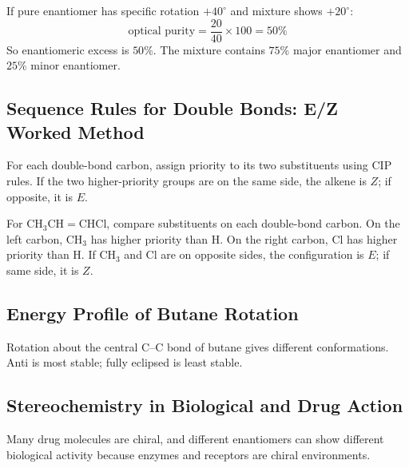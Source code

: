 \documentclass[12pt,a4paper]{article}
\begin{document}
\begin{tcolorbox}[examplebox, title={Solved Example: Enantiomeric Excess}]
If pure enantiomer has specific rotation $+40^\circ$ and mixture shows $+20^\circ$:
\[
\text{optical purity}=\frac{20}{40}\times100=50\%
\]
So enantiomeric excess is $50\%$. The mixture contains $75\%$ major enantiomer and $25\%$ minor enantiomer.
\end{tcolorbox}

\subsection{Sequence Rules for Double Bonds: E/Z Worked Method}
For each double-bond carbon, assign priority to its two substituents using CIP rules. If the two higher-priority groups are on the same side, the alkene is $Z$; if opposite, it is $E$.

\begin{tcolorbox}[examplebox, title={Worked Method: E/Z Assignment}]
For $\mathrm{CH_3CH=CHCl}$, compare substituents on each double-bond carbon. On the left carbon, $\mathrm{CH_3}$ has higher priority than H. On the right carbon, Cl has higher priority than H. If $\mathrm{CH_3}$ and Cl are on opposite sides, the configuration is $E$; if same side, it is $Z$.
\end{tcolorbox}

\subsection{Energy Profile of Butane Rotation}
Rotation about the central C--C bond of butane gives different conformations. Anti is most stable; fully eclipsed is least stable.

\begin{tcolorbox}[tikzbox, title={Qualitative Energy Profile for Butane Rotation}]
\centering
{}
\end{tcolorbox}

\subsection{Stereochemistry in Biological and Drug Action}
Many drug molecules are chiral, and different enantiomers can show different biological activity because enzymes and receptors are chiral environments.
\end{document}
